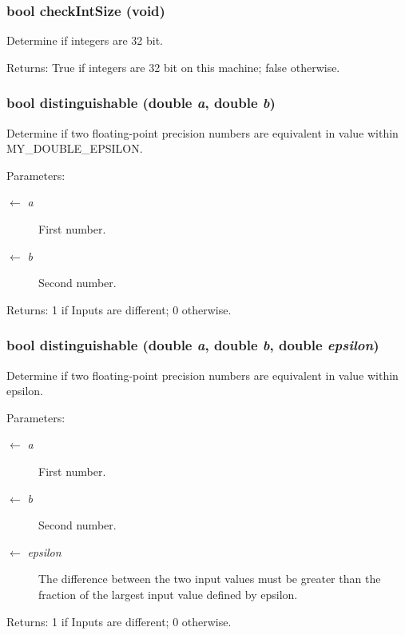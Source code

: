 \subsubsection{\setlength{\rightskip}{0pt plus 5cm}bool check\-Int\-Size (void)}\label{meshmorph_8h_1122d758f1b6eac91f763e9b10d306d2}


Determine if integers are 32 bit. \begin{Desc}
\item[Returns:]True if integers are 32 bit on this machine; false otherwise. \end{Desc}
\subsubsection{\setlength{\rightskip}{0pt plus 5cm}bool distinguishable (double {\em a}, double {\em b})}\label{meshmorph_8h_7e48ad73971e78bc20e3deb1e74546ad}


Determine if two floating-point precision numbers are equivalent in value within MY\_\-DOUBLE\_\-EPSILON. \begin{Desc}
\item[Parameters:]
\begin{description}
\item[\mbox{$\leftarrow$} {\em a}]First number. \item[\mbox{$\leftarrow$} {\em b}]Second number. \end{description}
\end{Desc}
\begin{Desc}
\item[Returns:]1 if Inputs are different; 0 otherwise. \end{Desc}
\subsubsection{\setlength{\rightskip}{0pt plus 5cm}bool distinguishable (double {\em a}, double {\em b}, double {\em epsilon})}\label{meshmorph_8h_54baf86f92ae2f215fbf2fc9d9913868}


Determine if two floating-point precision numbers are equivalent in value within epsilon. \begin{Desc}
\item[Parameters:]
\begin{description}
\item[\mbox{$\leftarrow$} {\em a}]First number. \item[\mbox{$\leftarrow$} {\em b}]Second number. \item[\mbox{$\leftarrow$} {\em epsilon}]The difference between the two input values must be greater than the fraction of the largest input value defined by epsilon. \end{description}
\end{Desc}
\begin{Desc}
\item[Returns:]1 if Inputs are different; 0 otherwise. \end{Desc}
